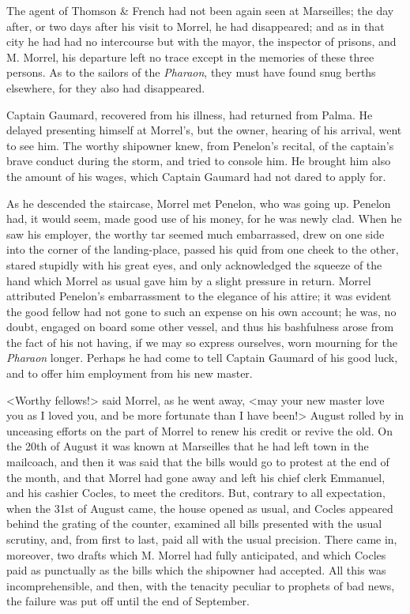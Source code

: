  The agent of Thomson \& French had not been again seen at Marseilles; the day after, or two days after his visit to Morrel, he had disappeared; and as in that city he had had no intercourse but with the mayor, the inspector of prisons, and M. Morrel, his departure left no trace except in the memories of these three persons. As to the sailors of the \textit{Pharaon}, they must have found snug berths elsewhere, for they also had disappeared. 

 Captain Gaumard, recovered from his illness, had returned from Palma. He delayed presenting himself at Morrel's, but the owner, hearing of his arrival, went to see him. The worthy shipowner knew, from Penelon's recital, of the captain's brave conduct during the storm, and tried to console him. He brought him also the amount of his wages, which Captain Gaumard had not dared to apply for. 

 As he descended the staircase, Morrel met Penelon, who was going up. Penelon had, it would seem, made good use of his money, for he was newly clad. When he saw his employer, the worthy tar seemed much embarrassed, drew on one side into the corner of the landing-place, passed his quid from one cheek to the other, stared stupidly with his great eyes, and only acknowledged the squeeze of the hand which Morrel as usual gave him by a slight pressure in return. Morrel attributed Penelon's embarrassment to the elegance of his attire; it was evident the good fellow had not gone to such an expense on his own account; he was, no doubt, engaged on board some other vessel, and thus his bashfulness arose from the fact of his not having, if we may so express ourselves, worn mourning for the \textit{Pharaon} longer. Perhaps he had come to tell Captain Gaumard of his good luck, and to offer him employment from his new master. 

 <Worthy fellows!> said Morrel,  as he went away, <may your new master love you as I loved you, and be more fortunate than I have been!>  August rolled by in unceasing efforts on the part of Morrel to renew his credit or revive the old. On the 20th of August it was known at Marseilles that he had left town in the mailcoach, and then it was said that the bills would go to protest at the end of the month, and that Morrel had gone away and left his chief clerk Emmanuel, and his cashier Cocles, to meet the creditors. But, contrary to all expectation, when the 31st of August came, the house opened as usual, and Cocles appeared behind the grating of the counter, examined all bills presented with the usual scrutiny, and, from first to last, paid all with the usual precision. There came in, moreover, two drafts which M. Morrel had fully anticipated, and which Cocles paid as punctually as the bills which the shipowner had accepted. All this was incomprehensible, and then, with the tenacity peculiar to prophets of bad news, the failure was put off until the end of September. 

